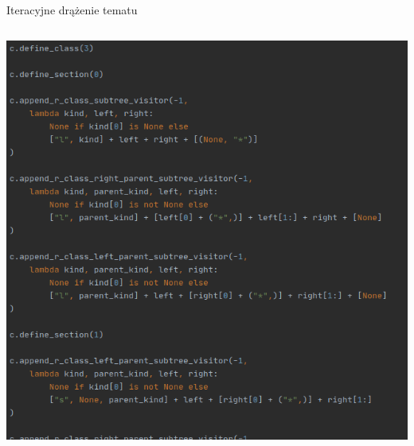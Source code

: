\documentclass[final]{beamer}
\theoremstyle{bluetheorem}
\theoremstyle{bluetheorem}
\theoremstyle{greentheorem}
\begin{document}
\begin{frame}{Iteracyjne drążenie tematu}
    \begin{columns}
        \begin{block}{}
            \begin{center}
                \includegraphics[width=\textwidth]{framework_006.png}
            \end{center}
        \end{block}


\end{columns}
\end{frame}
\end{document}

